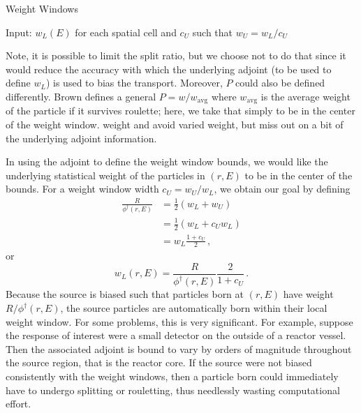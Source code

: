 \begin{algorithm}
 \label{alg:ww}
 \caption{Weight Windows}
    Input: $w_L(E)$ for each spatial cell and $c_U$ such that $w_U = w_L/c_U$ \;
\end{algorithm}

Note, it is possible to limit the split ratio, but we choose not to do that
since it would reduce the accuracy with which the underlying adjoint (to be used
to define $w_L$) is used to bias the transport.  Moreover, $P$ could also be
defined differently.  Brown defines a general $P = w/w_{\mathrm{avg}}$ where
$w_{\mathrm{avg}}$ is the average weight of the particle if it survives
roulette; here, we take that simply to be in the center of the weight window. 
weight and avoid varied weight, but miss out on a bit of the underlying adjoint
information.  

In using the adjoint to define the weight window bounds, we would like the
underlying statistical weight of the particles in $(r,E)$ to be in the center of
the bounds.  For a weight window width $c_U = w_U/w_L$, we obtain our goal by
defining
\begin{equation}
\begin{split}
  \frac{R}{\phi^\dag(r,E)} &= \frac{1}{2}(w_L + w_U) \\
                           &= \frac{1}{2}(w_L + c_U w_L) \\
                           &= w_L \frac{1+c_U}{2}\, ,
\end{split}
\end{equation}
or 
\begin{equation}
 w_L(r,E) = \frac{R}{\phi^\dag(r,E)} \frac{2}{1+c_U} \, .
\end{equation}
Because the source is biased such that particles born at $(r,E)$ have weight
$R/\phi^\dag(r,E)$, the source particles are automatically born within their
local weight window.  For some problems, this is very significant.  For example,
suppose the response of interest were a small detector on the outside of a
reactor vessel.  Then the associated adjoint is bound to vary by orders of
magnitude throughout the source region, that is the reactor core.  If the source
were not biased consistently with the weight windows, then a particle born could
immediately have to undergo splitting or rouletting, thus needlessly wasting
computational effort.

